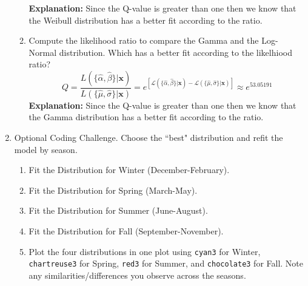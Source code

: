 \documentclass{article}\usepackage[]{graphicx}\usepackage[]{xcolor}
\newenvironment{knitrout}{}{} %
\begin{document}
\begin{enumerate}
\begin{enumerate}
    \textbf{Explanation:} Since the Q-value is greater than one then we know that the Weibull distribution has a better fit according to the ratio. \\
    \item Compute the likelihood ratio to compare the Gamma and the Log-Normal distribution.
    Which has a better fit according to the likelhiood ratio?
    \[Q = \frac{L(\{\hat{\alpha}, \hat{\beta}\}|\mathbf{x})}{L(\{\hat{\mu}, \hat{\sigma}\}|\mathbf{x})}=e^{\left[\mathcal{L}(\{\hat{\alpha}, \hat{\beta}\}|\mathbf{x}) - \mathcal{L}(\{\hat{\mu}, \hat{\sigma}\}|\mathbf{x})\right]} \approx e^{53.05191}\]
    \textbf{Explanation:} Since the Q-value is greater than one then we know that the Gamma distribution has a better fit according to the ratio. \\
  \end{enumerate}
  \item Optional Coding Challenge. Choose the ``best" distribution and refit the
  model by season.
  \begin{enumerate}
    \item Fit the Distribution for Winter (December-February).
    \item Fit the Distribution for Spring (March-May).
    \item Fit the Distribution for Summer (June-August).
    \item Fit the Distribution for Fall (September-November).
    \item Plot the four distributions in one plot using \texttt{cyan3} for Winter,
    \texttt{chartreuse3} for Spring, \texttt{red3} for Summer, and \texttt{chocolate3}
    for Fall. Note any similarities/differences you observe across the seasons.
    \begin{figure}[H]
    \begin{center}
\begin{knitrout}
\color{fgcolor}

\end{knitrout}
\end{center}
\end{figure}
\end{enumerate}
\end{enumerate}
\end{document}
